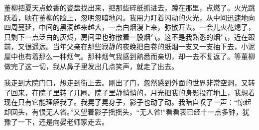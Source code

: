 \documentclass[12pt,oneside]{book}
\begin{document}
董柳把夏天点蚊香的瓷盘找出来，把那些碎纸抓进去，蹲在那里，点燃了。火光跳跃着，映在董柳的脸上，忽明忽暗地闪。我用力盯着闪动的火光，从中间迅速地向四周蔓延，中间的黑洞越来越大，一点白烟漫上来，弥散开去。一会儿火花熄了，只剩下一点泛白的灰烬，房间里也弥散着一股烟气。这不是我熟悉的烟气，近在跟前，又很遥远。当年父亲在那些寂静的夜晚把自卷的纸烟一支又一支抽下去，小泥屋中也有着那么一种烟气。那种烟气我感到熟悉而亲切，却一去不复返了。等董柳做完了这一切，我从鼻子里发出几点笑声，就走了出去。

我走到大院门口，想走到街上去。刚出了门，忽然感到外面的世界非常空洞，又转了回来，在院子里转了几圈。院子里静悄悄的，月光把我的身影投在地上，我想着现在只有它能理解我了。我晃了晃身子，影子也动了动。我暗自叹了一声：``惊起却回头，有恨无人省。''又望着影子摇摇头，``无人省!''看看表已经十一点多钟，犹豫了一下，还是向晏老师家走去。
\end{document}
